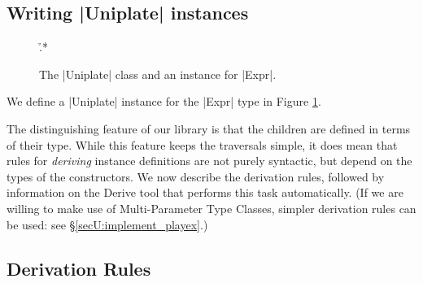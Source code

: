 \subsection{Writing |Uniplate| instances}
\label{secU:play_instances}

\begin{figure}
\h{.*}
\caption{The |Uniplate| class and an instance for |Expr|.}
\label{figU:play_expr}
\end{figure}

We define a |Uniplate| instance for the |Expr| type in Figure \ref{figU:play_expr}.

The distinguishing feature of our library is that the children are defined in terms of their type. While this feature keeps the traversals simple, it does mean that rules for \textit{deriving} instance definitions are not purely syntactic, but depend on the types of the constructors. We now describe the derivation rules, followed by information on the Derive tool that performs this task automatically. (If we are willing to make use of Multi-Parameter Type Classes, simpler derivation rules can be used: see \S\ref{secU:implement_playex}.)


\subsection{Derivation Rules}

